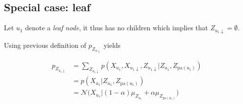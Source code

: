 \documentclass[11pt,oneside,a4paper]{article}
\theoremstyle{definition}
\theoremstyle{remark}
\begin{document}
\subsection*{Special case: leaf}
Let $u_1$ denote a \textit{leaf node}, it thus has no children which implies that $Z_{u_1 \downarrow} = \emptyset$.

Using previous definition of $p_{Z_{u \downarrow}}$ yields

 \begin{align}
   p_{Z_{u_1 \downarrow}} & = \sum_{Z_{u_1 \downarrow}} p(X_{u_1}, X_{u_1 \downarrow}, Z_{u_1 \downarrow}|Z_{u_1}, Z_{\text{pa}(u_1)}) \nonumber\\
   & = p(X_{u_1}|Z_{u_1}, Z_{\text{pa}(u_1)}) \nonumber\\
   & = \mathcal{N}\Big(X_{u_1} | (1-\alpha)\mu_{Z_{u_1}} + \alpha \mu_{Z_{\text{pa}(u_1)}} \Big)
 \end{align}
\end{document}
